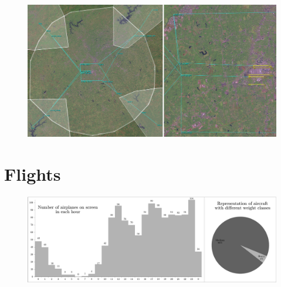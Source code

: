 \begin{figure}[h]
    \centering
    \includegraphics[width=\textwidth]{figures/routes.png}
    \caption{}
    \label{fig:routes}
\end{figure}

\section{Flights}

\begin{figure}[h]
    \centering
    \includegraphics[width=\textwidth]{graphs/real-flights_scissored.pdf}
    \caption{}
    \label{graph:flights}
\end{figure}






